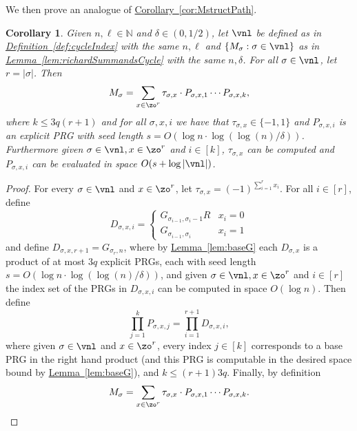 \documentclass[11pt]{article}
\newcommand{\expref}[2]{\texorpdfstring{\hyperref[#2]{#1~\ref{#2}}}{#1~\ref{#2}}}
\newtheorem{corollary}[theorem]{Corollary}
\newcommand{\N}{{\mathbb N}}
\begin{document}
We then prove an analogue of \expref{Corollary}{cor:MstructPath}.
\begin{corollary}\label{cor:MstructCycle}
Given $n,\ell \in  \N$ and $\delta \in (0,1/2)$, let $\vnl$ be defined as in \expref{Definition}{def:cycleIndex} with the same $n,\ell$ and $\{M_\sigma:\sigma\in\vnl\}$ as in \expref{Lemma}{lem:richardSummandsCycle} with the same $n,\delta$. For all $\sigma\in \vnl$, let $r=|\sigma|$. Then
\[M_\sigma=\sum_{x\in \zo^r}\tau_{\sigma,x}\cdot P_{\sigma,x,1}\cdots P_{\sigma,x,k},\]
where $k\leq 3q(r+1)$ and for all $\sigma,x,i$ we have that $\tau_{\sigma,x}\in \{-1,1\}$ and $P_{\sigma,x,i}$ is an explicit PRG with seed length $s=O(\log n\cdot\log(\log(n)/\delta))$.
Furthermore given $\sigma\in \vnl,x\in \zo^r$ and $i\in [k]$, $\tau_{\sigma,x}$ can be computed and $P_{\sigma,x,i}$ can be evaluated in space $O(s+\log|\vnl|)$.
\end{corollary}
\begin{proof}
For every $\sigma\in \vnl$ and $x\in \zo^{r}$, let $\tau_{\sigma,x}=(-1)^{\sum_{i=1}^{r}x_i}$. 
For all $i\in[r]$, define %
\[D_{\sigma,x,i} = \begin{cases}
G_{\sigma_{i-1},\sigma_i-1}R & x_i=0\\
G_{\sigma_{i-1},\sigma_i} & x_i=1
\end{cases}\]
and define $D_{\sigma,x,r+1}=G_{\sigma_{r},n}$, where by \expref{Lemma}{lem:baseG} each $D_{\sigma,x}$ is a product of at most $3q$ explicit PRGs, each with seed length $s=O(\log n\cdot\log(\log(n)/\delta))$, and given $\sigma\in \vnl,x\in \zo^r$ and $i\in[r]$ the index set of the PRGs in $D_{\sigma,x,i}$ can be computed in space $O(\log n)$. Then define %
$$\prod_{j=1}^kP_{\sigma,x,j}=\prod_{i=1}^{r+1}D_{\sigma,x,i},$$ 
where given $\sigma\in \vnl$ and $x\in \zo^r$, every index $j\in[k]$ corresponds to a base PRG in the right hand product (and this PRG is computable in the desired space bound by \expref{Lemma}{lem:baseG}), and $k\leq (r+1)3q$. Finally, by definition
\[M_\sigma=\sum_{x\in \zo^r}\tau_{\sigma,x}\cdot P_{\sigma,x,1}\cdots P_{\sigma,x,k}.\qedhere\]
\end{proof}
\end{document}
